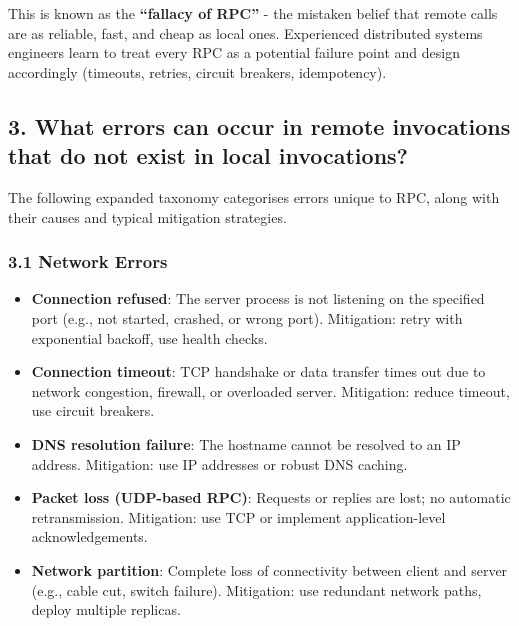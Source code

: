 \documentclass[10pt,a4paper]{article}
\begin{document}
This is known as the \textbf{“fallacy of RPC”} - the mistaken belief that remote calls are as reliable, fast, and cheap as local ones. Experienced distributed systems engineers learn to treat every RPC as a potential failure point and design accordingly (timeouts, retries, circuit breakers, idempotency).

\subsection{3. What errors can occur in remote invocations that do not exist in local invocations?}

The following expanded taxonomy categorises errors unique to RPC, along with their causes and typical mitigation strategies.

\subsubsection{3.1 Network Errors}
\begin{itemize}
    \item \textbf{Connection refused}: The server process is not listening on the specified port (e.g., not started, crashed, or wrong port). Mitigation: retry with exponential backoff, use health checks.
    \item \textbf{Connection timeout}: TCP handshake or data transfer times out due to network congestion, firewall, or overloaded server. Mitigation: reduce timeout, use circuit breakers.
    \item \textbf{DNS resolution failure}: The hostname cannot be resolved to an IP address. Mitigation: use IP addresses or robust DNS caching.
    \item \textbf{Packet loss (UDP-based RPC)}: Requests or replies are lost; no automatic retransmission. Mitigation: use TCP or implement application-level acknowledgements.
    \item \textbf{Network partition}: Complete loss of connectivity between client and server (e.g., cable cut, switch failure). Mitigation: use redundant network paths, deploy multiple replicas.
\end{itemize}
\end{document}
